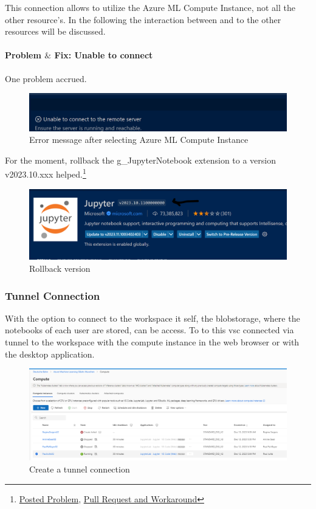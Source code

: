 This connection allows to utilize the Azure ML Compute Instance, not all the other resource's. In the following the interaction between and to the other resources will be discussed.

\paragraph{Problem $\&$ Fix: Unable to connect}
One problem accrued. 
\begin{figure}[H]
	\centering
	\includegraphics[scale = 0.3]{attachment/chapter_AML/Scc017}
	\caption{Error message after selecting Azure ML Compute Instance}
\end{figure}

For the moment, rollback the \gls{g_JupyterNotebook} extension to a version v2023.10.xxx helped.\footnote{
	\href{https://github.com/microsoft/vscode-jupyter/issues/14925}{Posted Problem}, \href{https://github.com/microsoft/vscode-jupyter/pull/14929}{Pull Request and Workaround}
}
\begin{figure}[H]
	\centering
	\includegraphics[scale = 0.3]{attachment/chapter_AML/Scc018}
	\caption{Rollback version}
\end{figure}

\subsubsection{Tunnel Connection}
With the option to connect to the workspace it self, the blobstorage, where the notebooks of each user are stored, can be access. To to this \gls{vsc} connected via tunnel to the workspace with the compute instance in the web browser or with the desktop application.
 
\begin{figure}[H]
	\centering
	\includegraphics[scale = 0.3]{attachment/chapter_AML/Scc022}
	\caption{Create a tunnel connection}
\end{figure}

